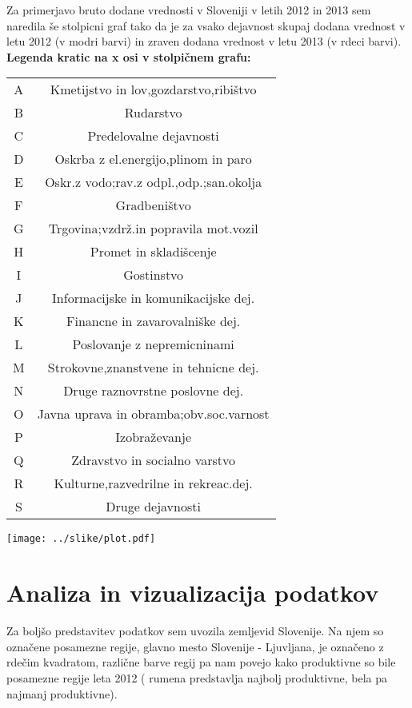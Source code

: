 \documentclass[11pt,a4paper]{article}
\begin{document}
Za primerjavo bruto dodane vrednosti v Sloveniji v letih 2012 in 2013
sem naredila še stolpicni graf tako da je za vsako dejavnost skupaj dodana vrednost v letu 2012 (v modri barvi) in zraven dodana vrednost v letu 2013
(v rdeci barvi).
\textbf{Legenda kratic na x osi v stolpičnem grafu:}
\begin{tabular}{c c}
A & Kmetijstvo in lov,gozdarstvo,ribištvo\\
B & Rudarstvo\\
C & Predelovalne dejavnosti\\
D & Oskrba z el.energijo,plinom in paro\\
E & Oskr.z vodo;rav.z odpl.,odp.;san.okolja\\
F & Gradbeništvo\\
G & Trgovina;vzdrž.in popravila mot.vozil\\
H & Promet in skladišcenje\\
I & Gostinstvo\\
J & Informacijske in komunikacijske dej.\\
K & Financne in zavarovalniške dej.\\
L & Poslovanje z nepremicninami\\
M & Strokovne,znanstvene in tehnicne dej.\\
N & Druge raznovrstne poslovne dej.\\
O & Javna uprava in obramba;obv.soc.varnost\\
P & Izobraževanje\\
Q & Zdravstvo in socialno varstvo\\
R & Kulturne,razvedrilne in rekreac.dej.\\
S & Druge dejavnosti\\
\end{tabular}
\begin{center}
 \texttt{[image: ../slike/plot.pdf]}

\end{center}

\section{Analiza in vizualizacija podatkov}



Za boljšo predstavitev podatkov sem uvozila zemljevid Slovenije. Na njem so označene posamezne regije, glavno mesto Slovenije - Ljuvljana, je označeno z rdečim kvadratom, različne barve regij pa nam povejo kako produktivne so bile posamezne regije leta 2012 ( rumena predstavlja najbolj produktivne, bela pa najmanj produktivne).
\end{document}
